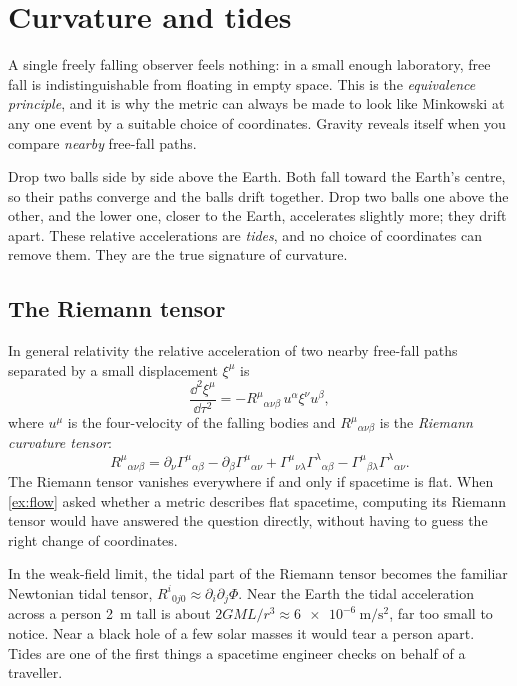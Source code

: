 \section{Curvature and tides}\label{sec:tides}

A single freely falling observer feels nothing: in a small enough laboratory,
free fall is indistinguishable from floating in empty space. This is the
\emph{equivalence principle}, and it is why the metric can always be made to
look like Minkowski at any one event by a suitable choice of coordinates.
Gravity reveals itself when you compare \emph{nearby} free-fall paths.

Drop two balls side by side above the Earth. Both fall toward the Earth's
centre, so their paths converge and the balls drift together. Drop two balls one
above the other, and the lower one, closer to the Earth, accelerates slightly
more; they drift apart. These relative accelerations are \emph{tides}, and no
choice of coordinates can remove them. They are the true signature of curvature.

\subsection{The Riemann tensor}

In general relativity the relative acceleration of two nearby free-fall paths
separated by a small displacement $\xi^{\mu}$ is
\begin{equation}
  \frac{\dd^{2}\xi^{\mu}}{\dd\tau^{2}} = -R^{\mu}{}_{\alpha\nu\beta}\,u^{\alpha}\xi^{\nu}u^{\beta},
  \label{eq:geodesic-deviation}
\end{equation}
where $u^{\mu}$ is the four-velocity of the falling bodies and
$R^{\mu}{}_{\alpha\nu\beta}$ is the \emph{Riemann curvature tensor}:
\begin{equation}
  R^{\mu}{}_{\alpha\nu\beta} = \partial_{\nu}\Gamma^{\mu}{}_{\alpha\beta}
  - \partial_{\beta}\Gamma^{\mu}{}_{\alpha\nu}
  + \Gamma^{\mu}{}_{\nu\lambda}\Gamma^{\lambda}{}_{\alpha\beta}
  - \Gamma^{\mu}{}_{\beta\lambda}\Gamma^{\lambda}{}_{\alpha\nu}.
  \label{eq:riemann}
\end{equation}
The Riemann tensor vanishes everywhere if and only if spacetime is flat. When
\cref{ex:flow} asked whether a metric describes flat spacetime, computing its
Riemann tensor would have answered the question directly, without having to
guess the right change of coordinates.

In the weak-field limit, the tidal part of the Riemann tensor becomes the
familiar Newtonian tidal tensor, $R^{i}{}_{0j0} \approx \partial_{i}\partial_{j}\Phi$.
Near the Earth the tidal acceleration across a person \SI{2}{\metre} tall is
about $2GM L/r^{3} \approx \SI{6e-6}{\metre\per\second\squared}$, far too small to
notice. Near a black hole of a few solar masses it would tear a person apart.
Tides are one of the first things a spacetime engineer checks on behalf of a
traveller.


